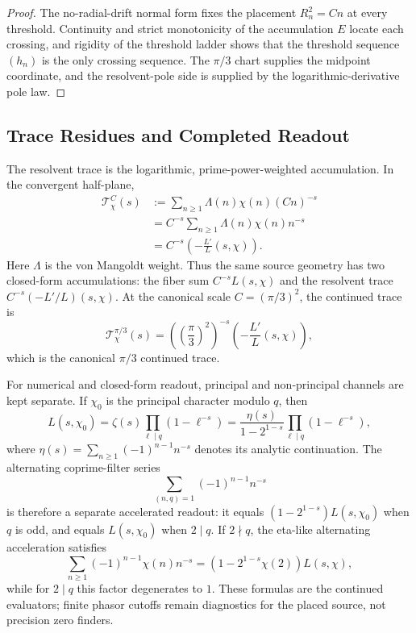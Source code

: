\documentclass[11pt]{article}
\begin{document}
\begin{proof}
The no-radial-drift normal form fixes the placement $R_n^2=Cn$ at every
threshold.  Continuity and strict monotonicity of the accumulation $E$ locate
each crossing, and rigidity of the threshold ladder shows that the threshold
sequence $(h_n)$ is the only crossing sequence.  The $\pi/3$ chart supplies the
midpoint coordinate, and the resolvent-pole side is supplied by the
logarithmic-derivative pole law.
\end{proof}

\subsection{Trace Residues and Completed Readout}

The resolvent trace is the logarithmic, prime-power-weighted accumulation.  In
the convergent half-plane,
\[
\begin{aligned}
  \mathcal T_\chi^C(s)
  &:=
  \sum_{n\ge1}\Lambda(n)\chi(n)(Cn)^{-s}  \\
  &=
  C^{-s}\sum_{n\ge1}\Lambda(n)\chi(n)n^{-s} \\
  &=
  C^{-s}\left(-\frac{L'}{L}(s,\chi)\right).
\end{aligned}
\]
Here $\Lambda$ is the von Mangoldt weight.  Thus the same source geometry has
two closed-form accumulations: the fiber sum $C^{-s}L(s,\chi)$ and the
resolvent trace $C^{-s}(-L'/L)(s,\chi)$.
At the canonical scale $C=(\pi/3)^2$, the continued trace is
\[
  \mathcal T_\chi^{\pi/3}(s)
  =
  \left(\left(\frac{\pi}{3}\right)^2\right)^{-s}
  \left(-\frac{L'}{L}(s,\chi)\right),
\]
which is the canonical $\pi/3$ continued trace.

For numerical and closed-form readout, principal and non-principal channels are
kept separate.  If $\chi_0$ is the principal character modulo $q$, then
\[
  L(s,\chi_0)
  =
  \zeta(s)\prod_{\ell\mid q}(1-\ell^{-s})
  =
  \frac{\eta(s)}{1-2^{1-s}}
  \prod_{\ell\mid q}(1-\ell^{-s}),
\]
where $\eta(s)=\sum_{n\ge1}(-1)^{n-1}n^{-s}$ denotes its analytic
continuation.  The alternating coprime-filter series
\[
  \sum_{(n,q)=1}(-1)^{n-1}n^{-s}
\]
is therefore a separate accelerated readout: it equals
$(1-2^{1-s})L(s,\chi_0)$ when $q$ is odd, and equals $L(s,\chi_0)$ when
$2\mid q$.
If $2\nmid q$, the eta-like alternating acceleration satisfies
\[
  \sum_{n\ge1}(-1)^{n-1}\chi(n)n^{-s}
  =
  (1-2^{1-s}\chi(2))L(s,\chi),
\]
while for $2\mid q$ this factor degenerates to $1$.  These formulas are the
continued evaluators; finite phasor cutoffs remain diagnostics for the placed
source, not precision zero finders.
\end{document}
